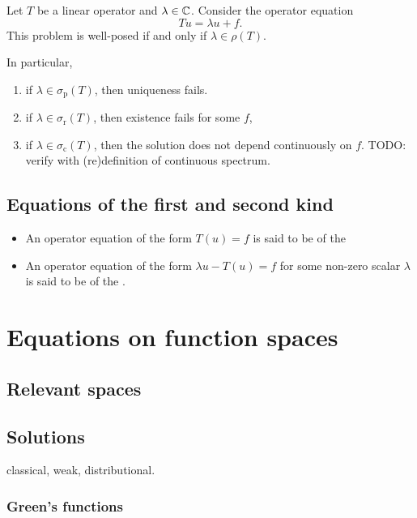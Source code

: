 \begin{proposition}
Let $T$ be a linear operator and $\lambda \in \mathbb{C}$. Consider the operator equation
\[  Tu = \lambda u + f. \]
This problem is well-posed if and only if $\lambda\in \rho(T)$.

In particular, 
\begin{enumerate}
\item if $\lambda\in\sigma_\text{p}(T)$, then uniqueness fails.
\item if $\lambda\in\sigma_\text{r}(T)$, then existence fails for some $f$,
\item if $\lambda\in\sigma_\text{c}(T)$, then the solution does not depend continuously on $f$. TODO: verify with (re)definition of continuous spectrum.
\end{enumerate}
\end{proposition}

\subsection{Equations of the first and second kind}
\begin{definition}
\begin{itemize}
\item An operator equation of the form $T(u) = f$ is said to be of the 
\item An operator equation of the form $\lambda u - T(u) = f$ for some non-zero scalar $\lambda$ is said to be of the .
\end{itemize}
\end{definition}

\section{Equations on function spaces}
\subsection{Relevant spaces}

\subsection{Solutions}
classical, weak, distributional.

\subsubsection{Green's functions}


